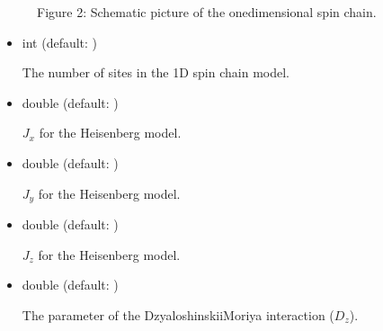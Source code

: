 \documentclass[letterpaper,10pt,dvipdfmx,openany,english]{sphinxmanual}
\begin{document}
\begin{figure}[htbp]
\centering
\capstart

\noindent{}
\caption{Figure 2: Schematic picture of the one\sphinxhyphen{}dimensional spin chain.}\label{\detokenize{shiftk_format_en:id2}}\label{\detokenize{shiftk_format_en:spin}}\end{figure}
\begin{itemize}
\item {} 

 int (default: )

The number of sites in the 1D spin chain model.

\item {} 

 double (default: )

 \(J_x\) for the Heisenberg model.

\item {} 

 double (default: )

 \(J_y\) for the Heisenberg model.

\item {} 

 double (default: )

 \(J_z\) for the Heisenberg model.

\item {} 

 double (default: )

The parameter of the Dzyaloshinskii\sphinxhyphen{}Moriya interaction (\(D_z\)).

\end{itemize}
\end{document}
